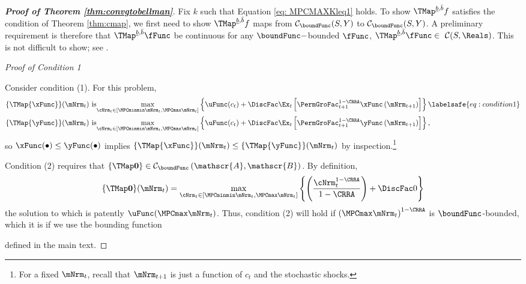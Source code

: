 \documentclass[\econtexRoot/BufferStockTheory]{subfiles}
\begin{document}
\begin{proof}[\textbf{Proof of Theorem \ref{thm:convgtobellman}}]
Fix $k$ such that Equation \eqref{eq: MPCMAXKleq1} holds.
To show $\TMap^{\underline{b}, \bar{b}} f$ satisfies the condition of Theorem \ref{thm:cmap}, we first need to show  $\TMap^{\underline{b}, \bar{b}} f$ maps from $\mathcal{C}_{\boundFunc}(S,Y)$ to $\mathcal{C}_{\boundFunc}(S,Y)$.
A preliminary requirement is therefore that $\TMap^{\underline{b}, \bar{b}} \fFunc$ be continuous for any $\boundFunc-$bounded $\fFunc$, $\TMap^{\underline{b}, \bar{b}} \fFunc  \in~\mathcal{C}(S,\Reals)$.
This is not difficult to show; see \cite{hiraguchiBSProofs}.



\vspace{0.7em} %
\noindent\textit{Proof of Condition 1}  %
\vspace{0.7em} %

Consider condition (1).
For this problem,
\begin{align*}
  \{\TMap{\mathfrak{\xFunc}}\}(\mNrm_{t}) &\mbox{~is}\underset{\cNrm_{t} \in
                                            [\MPCminmin \mNrm_{t}, \MPCmax \mNrm_{t}]
                                            }\max \left\{
                                            \uFunc(c_{t})+\DiscFac \Ex_{t}\left[ {\PermGroFac}_{t+1}^{1-\CRRA }{\mathfrak{\xFunc}}
                                            \left( {\mNrm}_{t+1}\right) \right] \right\}  \notag  \labelsafe{eq:condition1}
  \\
  \{\TMap{\mathfrak{\yFunc}}\}(\mNrm_{t}) &\mbox{~is}\underset{\cNrm_{t} \in
                                            [\MPCminmin \mNrm_{t}, \MPCmax \mNrm_{t}]
                                            }\max \left\{
                                            \uFunc(c_{t})+\DiscFac \Ex_{t}\left[ {\PermGroFac}_{t+1}^{1-\CRRA }{\mathfrak{\yFunc}}
                                            \left( {\mNrm}_{t+1}\right) \right] \right\} ,  \notag
\end{align*}%
so ${\mathfrak{\xFunc}}(\bullet) \leq {\mathfrak{\yFunc}}(\bullet)$ implies $\{\TMap{\mathfrak{\xFunc}}\}(\mNrm_{t}) \leq \{\TMap{\mathfrak{\yFunc}} \}(\mNrm_{t})$ by inspection.\footnote{For a fixed $\mNrm_{t}$, recall that ${\mNrm}_{t+1}$ is just a function of $c_{t}$ and the
  stochastic shocks.}

Condition (2) requires that $\{\TMap\mathbf{0}\}\in \mathcal{C}_{\boundFunc}\left(\mathscr{A},\mathscr{B}\right)$.
By definition,
\begin{equation*}
  \{\TMap \mathbf{0}\}(\mNrm_{t}) = \max_{\cNrm_{t} \in
    [\MPCminmin \mNrm_{t}, \MPCmax \mNrm_{t}]
  }\left\{ \left( \frac{\cNrm_{t}^{1-\CRRA }}{1-\CRRA }\right) +\DiscFac 0\right\}
\end{equation*}
the solution to which is patently
$\uFunc(\MPCmax \mNrm_{t})$.
Thus, condition (2)
will hold if ${(\MPCmax \mNrm_{t})}^{1-\CRRA}$ is $\boundFunc$-bounded, which it is if we use the
bounding function

defined in the main text.


\end{proof}
\end{document}

